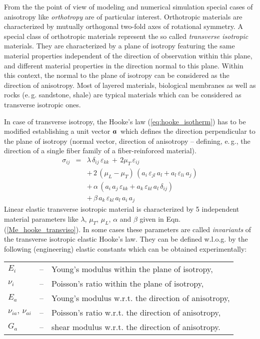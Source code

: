 From the the point of view of modeling and numerical simulation special cases of anisotropy like {\sl orthotropy} are of particular interest. Orthotropic materials are characterized by mutually orthogonal two-fold axes of rotational symmetry. A special class of orthotropic materials represent the so called {\sl transverse isotropic} materials. They are characterized by a plane of isotropy featuring the same material properties independent of the direction of observation within this plane, and different material properties in the direction normal to this plane. Within this context, the normal to the plane of isotropy can be considered as the direction of anisotropy. Most of layered materials, biological membranes as well as rocks (e.\,g. sandstone, shale) are typical materials which can be considered as transverse isotropic ones.

In case of transverse isotropy, the Hooke's law (\ref{eq:hooke_isotherm}) has to be modified establishing a unit vector $\mbox{${\mbox{\boldmath${a}$\unboldmath}}_{\:\!}$}$ which defines the direction perpendicular to the plane of isotropy (normal vector, direction of anisotropy -- defining, e.\,g., the direction of a single fiber family of a fiber-reinforced material).
\begin{eqnarray}
\sigma_{ij}& = & \lambda\,\delta_{ij}\,\varepsilon_{kk}\,+\,2\mu_T\,\varepsilon_{ij} \nonumber \\[1.50ex]
 &  & +\,2\,\left(\mu_L-\mu_T\right)\,\left(a_i\,\varepsilon_{jl}\,a_l+a_l\,\varepsilon_{li}\,a_j\right) 
 \nonumber \\[1.50ex]
 &  & +\,\alpha\,\left(a_i\,a_j\,\varepsilon_{kk}+a_k\,\varepsilon_{kl}\,a_l\,\delta_{ij}\right) 
 \nonumber \\[1.50ex]
 &  & +\,\beta\,a_k\,\varepsilon_{kl}\,a_l\,a_i\,a_j
\label{Me_hooke_transviso}
\end{eqnarray}
Linear elastic transverse isotropic material is characterized by 5 independent material parameters like $\lambda$, $\mu_T$, $\mu_L$, $\alpha$ and $\beta$ given in Eqn. (\ref{Me_hooke_transviso}). In some cases these parameters are called {\sl invariants} of the transverse isotropic elastic Hooke's law. They can be defined w.l.o.g. by the following (engineering) elastic constants which can be obtained experimentally: 

\begin{center}
\begin{tabular}{p{}p{}p{}}
$E_i$      & -- & Young's modulus within the plane of isotropy, \\[0.5ex]
$\nu_i$    & -- & Poisson's ratio within the plane of isotropy, \\[1.5ex]
$E_a$      & -- & Young's modulus w.r.t. the direction of anisotropy, \\[0.5ex]
$\nu_{ia},\,\nu_{ai}$ & -- & Poisson's ratio w.r.t. the direction of anisotropy, \\[0.5ex]
$G_a$      & -- & shear modulus w.r.t. the direction of anisotropy.
\end{tabular}
\end{center}

